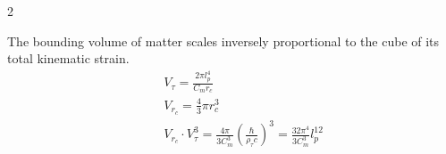 \begin{multicols}{2}
\begin{tcolorbox}[cheatbox, title={\refstepcounter{cheatnum}\label{box:volumetric_inverse_cube}\thecheatnum. Volumetric Approximations \scriptsize\hfill\hyperref[sec:deriv_volumetric_inverse_cube]{[Proof $\downarrow$]}}] 
The bounding volume of matter scales inversely proportional to the cube of its total kinematic strain.
\begin{align}
    &\quad V_\tau = \frac{2\pi l_p^4}{C_m r_c} \label{eq:strain_volume_rc} \\ 
    &\quad V_{r_c} = \frac{4}{3}\pi r_c^3 \label{eq:coordinate_volume} \\
    &\quad V_{r_c} \cdot V_{\tau}^3 = \frac{4\pi}{3C_m^3} \left( \frac{\hbar}{\rho_{\tau} c} \right)^3 = \frac{32\pi^4}{3C_m^3} l_p^{12} \label{eq:volumetric_inverse_cube} 
\end{align}
\end{tcolorbox}


\end{multicols}
